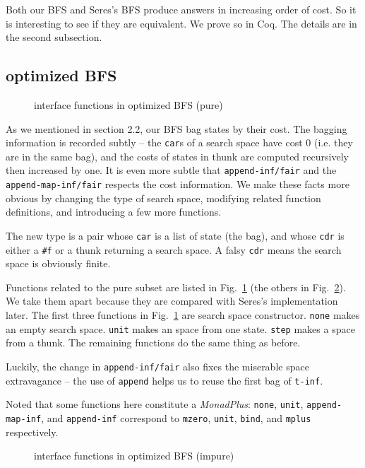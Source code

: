 \documentclass[format=acmlarge, review=true, authordraft=true]{acmart}
\begin{document}
Both our BFS and Seres's BFS \citep{seres1999algebra} produce answers in 
increasing order of cost. So it is interesting to see if they are equivalent. 
We prove so in Coq. The details are in the second subsection.

\subsection{optimized BFS}

\begin{figure}
		
	\caption{interface functions in optimized BFS (pure)}
	\label{BFS-opt}
\end{figure}

As we mentioned in section 2.2, our BFS bag states by their cost. The bagging 
information is recorded subtly -- the \texttt{car}s of a search space have cost 
0 (i.e. they are in the same bag), and the costs of states in thunk are 
computed recursively then increased by one. It is even more subtle that
\texttt{append-inf/fair} and the \texttt{append-map-inf/fair} respects the cost 
information. We make these facts more obvious by changing the type of search 
space, modifying related function definitions, and introducing a few more 
functions.

The new type is a pair whose \texttt{car} is a list of state (the bag), and 
whose \texttt{cdr} is either a \texttt{\#{}f} or a thunk returning a search 
space. A falsy \texttt{cdr} means the search space is obviously finite. 

Functions related to the pure subset are listed in Fig.~\ref{BFS-opt} (the 
others in Fig.~\ref{BFS-opt-cont}). We take them apart because they are 
compared with Seres's implementation later. The first three functions in 
Fig.~\ref{BFS-opt} are search space constructor. \texttt{none} makes an empty 
search space. \texttt{unit} makes an space from one state. \texttt{step} makes 
a space from a thunk. The remaining functions do the same thing as before. 

Luckily, the change in \texttt{append-inf/fair} also fixes the miserable space 
extravagance -- the use of \texttt{append} helps us to reuse the first bag of 
\texttt{t-inf}.

Noted that some functions here constitute a \emph{MonadPlus}: 
\texttt{none}, \texttt{unit}, \texttt{append-map-inf}, and \texttt{append-inf} 
correspond to \texttt{mzero}, \texttt{unit}, \texttt{bind}, and \texttt{mplus} 
respectively.

\begin{figure}
		
	\caption{interface functions in optimized BFS (impure)}
	\label{BFS-opt-cont}
\end{figure}
\end{document}
